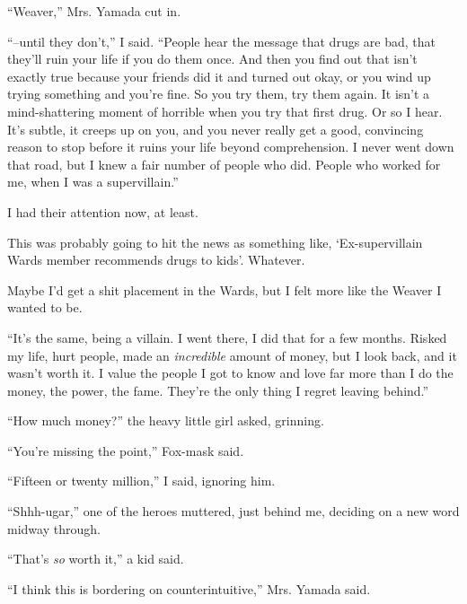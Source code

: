 ``Weaver,'' Mrs. Yamada cut in.



``--until they don't,'' I said.  ``People hear the message that drugs are bad, that they'll ruin your life if you do them once.  And then you find out that isn't exactly true because your friends did it and turned out okay, or you wind up trying something and you're fine.  So you try them, try them again.  It isn't a mind-shattering moment of horrible when you try that first drug.  Or so I hear.  It's subtle, it creeps up on you, and you never really get a good, convincing reason to stop before it ruins your life beyond comprehension.  I never went down that road, but I knew a fair number of people who did.  People who worked for me, when I was a supervillain.''



I had their attention now, at least.



This was probably going to hit the news as something like, `Ex-supervillain Wards member recommends drugs to kids'.  Whatever.



Maybe I'd get a shit placement in the Wards, but I felt more like the Weaver I wanted to be.



``It's the same, being a villain.  I went there, I did that for a few months.  Risked my life, hurt people, made an \emph{incredible} amount of money, but I look back, and it wasn't worth it.  I value the people I got to know and love far more than I do the money, the power, the fame.  They're the only thing I regret leaving behind.''



``How much money?'' the heavy little girl asked, grinning.



``You're missing the point,'' Fox-mask said.



``Fifteen or twenty million,'' I said, ignoring him.



``Shhh-ugar,'' one of the heroes muttered, just behind me, deciding on a new word midway through.



``That's \emph{so} worth it,'' a kid said.



``I think this is bordering on counterintuitive,'' Mrs. Yamada said.



